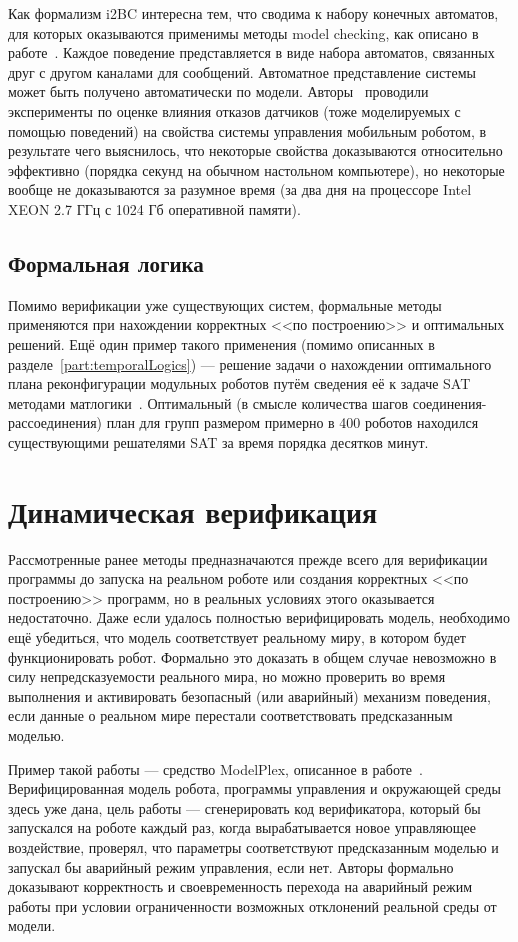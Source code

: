 \documentclass[conference]{IEEEtran}
\begin{document}
Как формализм i2BC интересна тем, что сводима к набору конечных 
автоматов, для которых оказываются применимы методы model checking, как описано 
в работе~\cite{kiekbusch2014behaviour}. Каждое поведение представляется в виде 
набора автоматов, связанных друг с другом каналами для сообщений. Автоматное представление системы 
может быть получено автоматически по модели. Авторы~\cite{kiekbusch2014behaviour}
проводили эксперименты по оценке влияния отказов датчиков (тоже моделируемых с 
помощью поведений) на свойства системы управления мобильным роботом, в 
результате чего выяснилось, что некоторые свойства доказываются относительно 
эффективно (порядка секунд на обычном настольном компьютере), но некоторые 
вообще не доказываются за разумное время (за два дня на процессоре 
Intel XEON 2.7 ГГц с 1024 Гб оперативной памяти).

\subsection{Формальная логика}
Помимо верификации уже существующих систем, формальные методы применяются при 
нахождении корректных <<по построению>> и оптимальных решений. Ещё один пример 
такого применения (помимо описанных в разделе~\ref{part:temporalLogics}) --- решение 
задачи о нахождении оптимального плана реконфигурации модульных роботов путём 
сведения её к задаче SAT методами матлогики~\cite{gorbenko2012reconfigurable}. 
Оптимальный (в смысле количества шагов соединения-рассоединения) план для групп 
размером примерно в 400 роботов находился существующими решателями SAT за время 
порядка десятков минут.

\section{Динамическая верификация}
Рассмотренные ранее методы предназначаются прежде всего для верификации 
программы до запуска на реальном роботе или создания корректных <<по построению>> 
программ, но в реальных условиях этого оказывается недостаточно. Даже если 
удалось полностью верифицировать модель, необходимо ещё убедиться, что модель 
соответствует реальному миру, в котором будет функционировать робот. Формально 
это доказать в общем случае невозможно в силу непредсказуемости реального мира, 
но можно проверить во время выполнения и активировать безопасный (или аварийный) 
механизм поведения, если данные о реальном мире перестали соответствовать 
предсказанным моделью.

Пример такой работы --- средство ModelPlex, описанное в работе~\cite{mitsch2014modelplex}. 
Верифицированная модель робота, программы управления и окружающей среды здесь 
уже дана, цель работы --- сгенерировать код верификатора, который бы запускался 
на роботе каждый раз, когда вырабатывается новое управляющее воздействие, 
проверял, что параметры соответствуют предсказанным моделью и запускал бы 
аварийный режим управления, если нет. Авторы формально доказывают корректность 
и своевременность перехода на аварийный режим работы при условии ограниченности
возможных отклонений реальной среды от модели.
\end{document}
